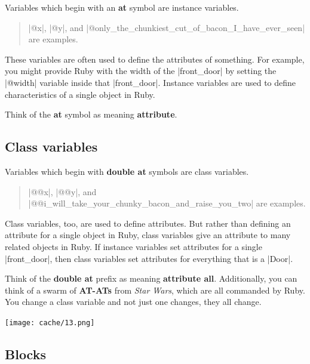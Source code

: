\documentclass[12pt,twoside]{report}
\begin{document}
Variables which begin with an {\bf at} symbol are instance variables.

\begin{quote}
\rubyinline|@x|, \rubyinline|@y|, and
\rubyinline|@only_the_chunkiest_cut_of_bacon_I_have_ever_seen|
are examples.\end{quote}


These variables are often used to define the attributes of something.
For example, you might provide Ruby with the width of the
\rubyinline|front_door| by setting the
\rubyinline|@width| variable inside that
\rubyinline|front_door|.  Instance variables are used
to define characteristics of a single object in Ruby.

Think of the {\bf at} symbol as meaning {\bf attribute}.




\subsection{Class variables}



Variables which begin with {\bf double at} symbols are class
variables.

\begin{quote}
\rubyinline|@@x|, \rubyinline|@@y|,
and
\rubyinline|@@i_will_take_your_chunky_bacon_and_raise_you_two|
are examples.\end{quote}


Class variables, too, are used to define attributes.  But rather than
defining an attribute for a single object in Ruby, class variables
give an attribute to many related objects in Ruby.  If instance
variables set attributes for a single
\rubyinline|front_door|, then class variables set
attributes for everything that is a \rubyinline|Door|.

Think of the {\bf double at} prefix as meaning {\bf attribute all}.
Additionally, you can think of a swarm of {\bf AT-ATs} from {\em Star
  Wars}, which are all commanded by Ruby.  You change a class variable
and not just one changes, they all change.


	\hspace{5cm}\texttt{[image: cache/13.png]}




\subsection{Blocks}
\end{document}
